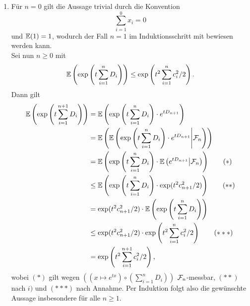 \documentclass[12pt]{scrartcl}
\begin{document}
\begin{enumerate}[$i)$,wide]
Dann ergibt sich für alle $k$, mit der Ungleichung 
$$ (2k)! \geq 2^kk! ,$$
dass gilt
$$ \frac{t^2\cn^2}{(2k)!} \leq \frac{t^2\cn^2}{2^kk!} .$$
\\
Also gilt auch $\cosh(t\cn) \leq \exp(t^2 \cn^2 / 2)$ und damit insgesamt
$$ \E(e^{tD_n}|\F_{n-1})\le\exp(t^2 c_n^2/2).$$


\item Für $n=0$ gilt die Aussage trivial durch die Konvention
$$\sum_{i=1}^0 x_i=0$$
und $\mathbb{E}(1)=1$, wodurch der Fall $n=1$ im Induktionsschritt mit bewiesen werden kann.\\
Sei nun $n\ge 0$ mit
\begin{equation}
\mathbb{E}\left(\exp\left(t\sum_{i=1}^n D_i\right)\right)\le\exp\left(t^2\sum_{i=1}^n c_i^2/2\right).
\end{equation}
Dann gilt
\begin{align*}
\mathbb{E}\left(\exp\left(t\sum_{i=1}^{n+1} D_i\right)\right)
&= \mathbb{E}\left(\exp\left(t\sum_{i=1}^n D_i\right)
\cdot e^{tD_{n+1}}\right) \\
&= \mathbb{E}\left(\mathbb{E}\left(\exp\left(t\sum_{i=1}^n D_i\right)
\cdot e^{tD_{n+1}}\middle|\mathcal{F}_n\right)\right) \\
&= \mathbb{E}\left(\exp\left(t\sum_{i=1}^n D_i\right)
\cdot \mathbb{E}\left(e^{tD_{n+1}}\middle|\mathcal{F}_n\right)\right) \tag{$\ast$}\\
&\le \mathbb{E}\left(\exp\left(t\sum_{i=1}^n D_i\right)
\cdot \exp(t^2c_{n+1}^2/2)\right) \tag{$\ast\ast$}\\
&= \exp(t^2c_{n+1}^2/2)
\cdot \mathbb{E}\left(\exp\left(t\sum_{i=1}^n D_i\right)\right) \\
&\le \exp(t^2c_{n+1}^2/2) \cdot \exp\left(t^2\sum_{i=1}^n c_i^2/2\right) \tag{$\ast\ast\ast$}\\
&= \exp\left(t^2\sum_{i=1}^{n+1} c_i^2/2\right),
\end{align*}
wobei $(\ast)$ gilt wegen $((x\mapsto e^{tx})\circ(\sum_{i=1}^n D_i))$ $\mathcal{F}_n$-messbar, $(\ast\ast)$ nach $i)$ und $(\ast\ast\ast)$ nach Annahme.
Per Induktion folgt also die gewünschte Aussage insbesondere für alle $n\ge 1$.


\end{enumerate}
\end{document}
